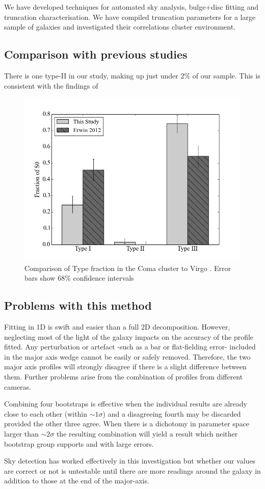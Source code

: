 
We have developed techniques for automated sky analysis, bulge+disc fitting and truncation characterisation. We have compiled truncation parameters for a large sample of galaxies and investigated their correlations cluster environment. 

\subsection{Comparison with previous studies}
There is one type-II in our study, making up just under 2\% of our sample. This is consistent with the findings of \citet{erwin_strong_2012}
\begin{figure}
	\centering
	\includegraphics[width=\textwidth]{figs/total_bar_chart_truncs.png}
	\caption{Comparison of Type fraction in the Coma cluster to Virgo \citep{erwin_strong_2012}. Error bars show 68\% confidence intervals \citep{wilson_probable_1927}}
\end{figure}

\subsection{Problems with this method}
Fitting in 1D is swift and easier than a full 2D decomposition. However, neglecting most of the light of the galaxy impacts on the accuracy of the profile fitted. Any perturbation or artefact -such as a bar or flat-fielding error- included in the major axis wedge cannot be easily or safely removed. Therefore, the two major axis profiles will strongly disagree if there is a slight difference between them. Further problems arise from the combination of profiles from different cameras. 

Combining four bootstraps is effective when the individual results are already close to each other (within $\sim 1\sigma$) and a disagreeing fourth may be discarded provided the other three agree. When there is a dichotomy in parameter space larger than $\sim 2\sigma$ the resulting combination will yield a result which neither bootstrap group supports and with large errors. 

Sky detection has worked effectively in this investigation but whether our values are correct or not is untestable until there are more readings around the galaxy in addition to those at the end of the major-axis. 